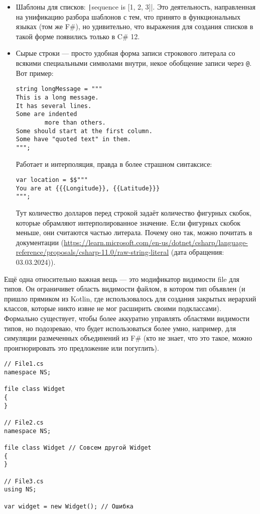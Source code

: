 \documentclass{../../text-style}
\begin{document}
\begin{itemize}
    \item Шаблоны для списков: \texttt|sequence is [1, 2, 3]|. Это деятельность, направленная на унификацию разбора шаблонов с тем, что принято в функциональных языках (том же F\#), но удивительно, что выражения для создания списков в такой форме появились только в C\# 12.
    \item Сырые строки --- просто удобная форма записи строкового литерала со всякими специальными символами внутри, некое обобщение записи через \verb|@|. Вот пример:
        \begin{verbatim}
string longMessage = """
This is a long message.
It has several lines.
Some are indented
        more than others.
Some should start at the first column.
Some have "quoted text" in them.
""";
        \end{verbatim}
    Работает и интерполяция, правда в более страшном синтаксисе:
        \begin{verbatim}
var location = $$"""
You are at {{{Longitude}}, {{Latitude}}}
""";
        \end{verbatim}
    Тут количество долларов перед строкой задаёт количество фигурных скобок, которые обрамляют интерполированное значение. Если фигурных скобок меньше, они считаются частью литерала. Почему оно так, можно почитать в документации (\url{https://learn.microsoft.com/en-us/dotnet/csharp/language-reference/proposals/csharp-11.0/raw-string-literal} (дата обращения: 03.03.2024)).
\end{itemize}

Ещё одна относительно важная вещь --- это модификатор видимости file для типов. Он ограничивет область видимости файлом, в котором тип объявлен (и пришло прямиком из Kotlin, где использовалось для создания закрытых иерархий классов, которые никто извне не мог расширить своими подклассами). Формально существует, чтобы более аккуратно управлять областями видимости типов, но подозреваю, что будет использоваться более умно, например, для симуляции размеченных объединений из F\# (кто не знает, что это такое, можно проигнорировать это предложение или погуглить).

\begin{verbatim}
// File1.cs
namespace NS;

file class Widget
{
}

// File2.cs
namespace NS;

file class Widget // Совсем другой Widget
{
}

// File3.cs
using NS;

var widget = new Widget(); // Ошибка
\end{verbatim}
\end{document}
